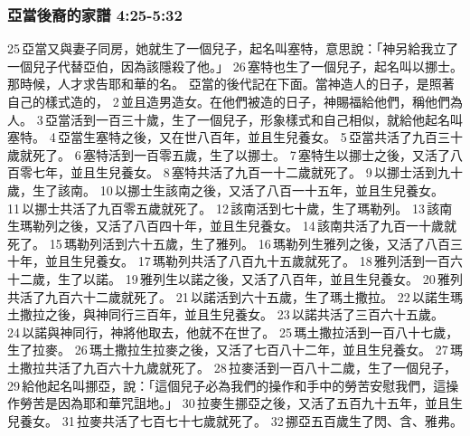 \subsubsection{亞當後裔的家譜 4:25-5:32}
25 亞當又與妻子同房，她就生了一個兒子，起名叫塞特，意思說：「神另給我立了一個兒子代替亞伯，因為該隱殺了他。」 26 塞特也生了一個兒子，起名叫以挪士。那時候，人才求告耶和華的名。
亞當的後代記在下面。當神造人的日子，是照著自己的樣式造的， 2 並且造男造女。在他們被造的日子，神賜福給他們，稱他們為人。 3 亞當活到一百三十歲，生了一個兒子，形象樣式和自己相似，就給他起名叫塞特。 4 亞當生塞特之後，又在世八百年，並且生兒養女。 5 亞當共活了九百三十歲就死了。
6 塞特活到一百零五歲，生了以挪士。 7 塞特生以挪士之後，又活了八百零七年，並且生兒養女。 8 塞特共活了九百一十二歲就死了。
9 以挪士活到九十歲，生了該南。 10 以挪士生該南之後，又活了八百一十五年，並且生兒養女。 11 以挪士共活了九百零五歲就死了。
12 該南活到七十歲，生了瑪勒列。 13 該南生瑪勒列之後，又活了八百四十年，並且生兒養女。 14 該南共活了九百一十歲就死了。
15 瑪勒列活到六十五歲，生了雅列。 16 瑪勒列生雅列之後，又活了八百三十年，並且生兒養女。 17 瑪勒列共活了八百九十五歲就死了。
18 雅列活到一百六十二歲，生了以諾。 19 雅列生以諾之後，又活了八百年，並且生兒養女。 20 雅列共活了九百六十二歲就死了。
21 以諾活到六十五歲，生了瑪土撒拉。 22 以諾生瑪土撒拉之後，與神同行三百年，並且生兒養女。 23 以諾共活了三百六十五歲。 24 以諾與神同行，神將他取去，他就不在世了。
25 瑪土撒拉活到一百八十七歲，生了拉麥。 26 瑪土撒拉生拉麥之後，又活了七百八十二年，並且生兒養女。 27 瑪土撒拉共活了九百六十九歲就死了。
28 拉麥活到一百八十二歲，生了一個兒子， 29 給他起名叫挪亞，說：「這個兒子必為我們的操作和手中的勞苦安慰我們，這操作勞苦是因為耶和華咒詛地。」 30 拉麥生挪亞之後，又活了五百九十五年，並且生兒養女。 31 拉麥共活了七百七十七歲就死了。 32 挪亞五百歲生了閃、含、雅弗。

